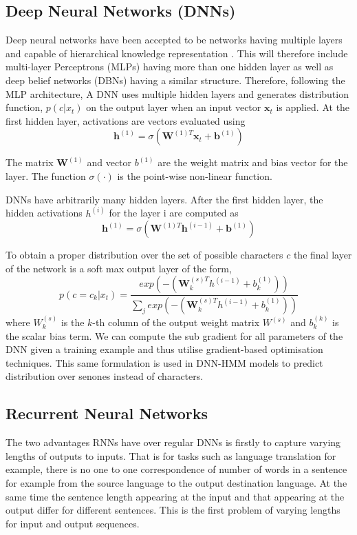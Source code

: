 \subsection{Deep Neural Networks (DNNs)}

Deep neural networks have been accepted to be networks having multiple layers and capable of hierarchical knowledge representation \citep{yu2016automatic}.
 This will therefore include multi-layer Perceptrons (MLPs) having more than one hidden layer \citep{dahl2012context} as well as deep belief networks (DBNs)\citep{mohamed2009deep,yu2010roles} having a similar structure.  Therefore, following the MLP architecture, A DNN uses multiple hidden layers and generates distribution function, $p(c|x_t)$ on the output layer when an input vector $\mathbf{x}_t$ is applied.  At the first hidden layer, activations are vectors evaluated using
\begin{equation}\mathbf{h}^{(1)}=\sigma(\mathbf{W}^{(1)T}\mathbf{x}_t+\mathbf{b}^{(1)})
\label{eqn_c3_dnn01}\end{equation}

The matrix $\mathbf{W}^{(1)}$ and vector $b^{(1)}$ are the weight matrix and bias vector for the layer.  The function $\sigma(\cdot)$ is the point-wise non-linear function.

DNNs have arbitrarily many hidden layers. After the first hidden layer, the hidden activations $h^{(i)}$ for the layer i are computed as
\begin{equation}\mathbf{h}^{(1)}=\sigma(\mathbf{W}^{(1)T}\mathbf{h}^{(i-1)}+\mathbf{b}^{(1)})
\label{eqn_c3_dnn02}\end{equation}

To obtain a proper distribution over the set of possible characters $c$ the final layer of the network is a soft max output layer of the form,
\begin{equation}p(c=c_k|x_t)=\frac{exp(-(\mathbf{W}^{(s)T}_kh^{(i-1)}+b_k^{(1)}))}{\sum_j exp(-(\mathbf{W}^{(s)T}_kh^{(i-1)}+b_k^{(1)}))}
\label{eqn_c3_dnn02}\end{equation}
where $W_k^{(s)}$ is the $k$-th column of the output weight matrix $W^{(s)}$ and $b_k^{(k)}$ is the scalar bias term.  We can compute the sub gradient for all parameters of the DNN given a training example and thus utilise gradient-based optimisation techniques.  This same formulation is used in DNN-HMM models to predict distribution over senones instead of characters.

\subsection{Recurrent Neural Networks}
The two advantages RNNs have over regular DNNs is firstly to capture varying lengths of outputs to inputs.  That is for tasks such as language translation for example, there is no one to one correspondence of number of words in a sentence for example from the source language to the output destination language.  At the same time the sentence length appearing at the input and that appearing at the output differ for different sentences.  This is the first problem of varying lengths for input and output sequences.

